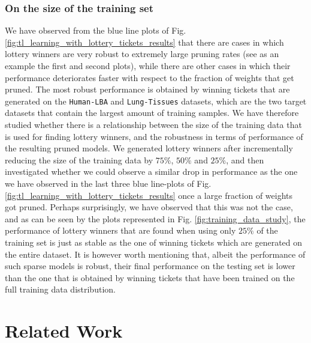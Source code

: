 \subsubsection{On the size of the training set}
We have observed from the blue line plots of Fig. \ref{fig:tl_learning_with_lottery_tickets_results} that there are cases in which lottery winners are very robust to extremely large pruning rates (see as an example the first and second plots), while there are other cases in which their performance deteriorates faster with respect to the fraction of weights that get pruned. The most robust performance is obtained by winning tickets that are generated on the \texttt{Human-LBA} and \texttt{Lung-Tissues} datasets, which are the two target datasets that contain the largest amount of training samples. We have therefore studied whether there is a relationship between the size of the training data that is used for finding lottery winners, and the robustness in terms of performance of the resulting pruned models. We generated lottery winners after incrementally reducing the size of the training data by $75\%$, $50\%$ and $25\%$, and then investigated whether we could observe a similar drop in performance as the one we have observed in the last three blue line-plots of Fig. \ref{fig:tl_learning_with_lottery_tickets_results} once a large fraction of weights got pruned. Perhaps surprisingly, we have observed that this was not the case, and as can be seen by the plots represented in Fig. \ref{fig:training_data_study}, the performance of lottery winners that are found when using only $25\%$ of the training set is just as stable as the one of winning tickets which are generated on the entire dataset. It is however worth mentioning that, albeit the performance of such sparse models is robust, their final performance on the testing set is lower than the one that is obtained by winning tickets that have been trained on the full training data distribution.




\section{Related Work}
\label{sec:related_work}

